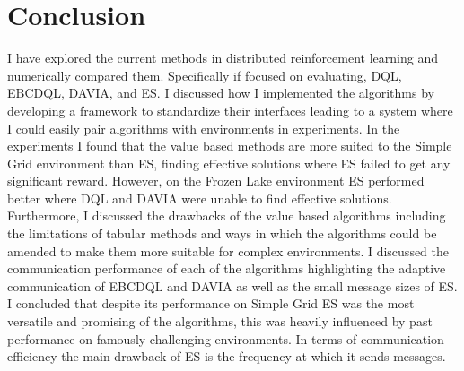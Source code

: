 



\section{Conclusion}

I have explored the current methods in distributed reinforcement learning and numerically compared them. Specifically if focused on evaluating, DQL, EBCDQL, DAVIA, and ES. I discussed how I implemented the algorithms by developing a framework to standardize their interfaces leading to a system where I could easily pair algorithms with environments in experiments. In the experiments I found that the value based methods are more suited to the Simple Grid environment than ES, finding effective solutions where ES failed to get any significant reward. However, on the Frozen Lake environment ES performed better where DQL and DAVIA were unable to find effective solutions. Furthermore, I discussed the drawbacks of the value based algorithms including the limitations of tabular methods and ways in which the algorithms could be amended to make them more suitable for complex environments. I discussed the communication performance of each of the algorithms highlighting the adaptive communication of EBCDQL and DAVIA as well as the small message sizes of ES. I concluded that despite its performance on Simple Grid ES was the most versatile and promising of the algorithms, this was heavily influenced by past performance on famously challenging environments. In terms of communication efficiency the main drawback of ES is the frequency at which it sends messages.

